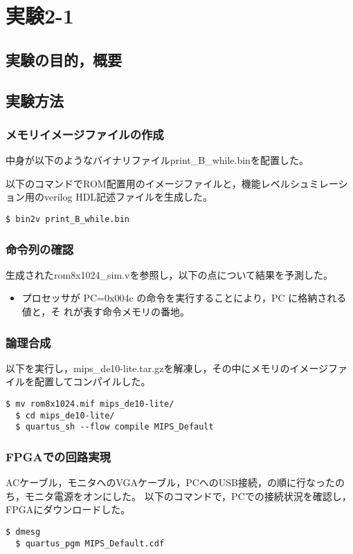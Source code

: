 
\section{実験2-1}
\subsection{実験の目的，概要}

\subsection{実験方法}
\subsubsection{メモリイメージファイルの作成}
中身が以下のようなバイナリファイルprint\_B\_while.binを配置した。


以下のコマンドでROM配置用のイメージファイルと，機能レベルシュミレーション用のverilog HDL記述ファイルを生成した。
\begin{lstlisting}[caption={イメージファイルの作成},label={イメージファイルの作成2-1}]
  $ bin2v print_B_while.bin
\end{lstlisting}

\subsubsection{命令列の確認}
生成されたrom8x1024\_sim.vを参照し，以下の点について結果を予測した。
\begin{itemize}
  \item プロセッサが PC=0x004c の命令を実行することにより，PC に格納される値と，そ
  れが表す命令メモリの番地。
\end{itemize}

\subsubsection{論理合成}
以下を実行し，mips\_de10-lite.tar.gzを解凍し，その中にメモリのイメージファイルを配置してコンパイルした。
\begin{lstlisting}[caption={論理合成操作},label={論理合成操作2-1}]
  $ mv rom8x1024.mif mips_de10-lite/
  $ cd mips_de10-lite/
  $ quartus_sh --flow compile MIPS_Default
\end{lstlisting}

\subsubsection{FPGAでの回路実現}
ACケーブル，モニタへのVGAケーブル，PCへのUSB接続，の順に行なったのち，モニタ電源をオンにした。
以下のコマンドで，PCでの接続状況を確認し，FPGAにダウンロードした。
\begin{lstlisting}[caption={FPGAでの回路実現},label={FPGAでの回路実現2-1}]
  $ dmesg
  $ quartus_pgm MIPS_Default.cdf
\end{lstlisting}

